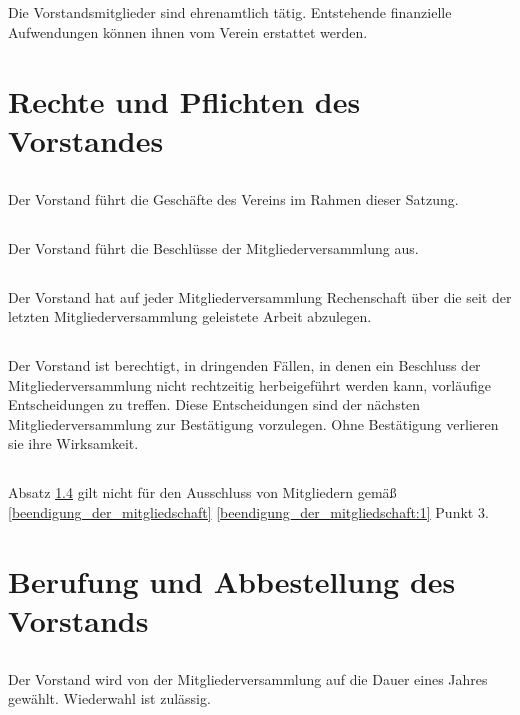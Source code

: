 \documentclass[12pt]{article}
\begin{document}
\subsection{}
Die Vorstandsmitglieder sind ehrenamtlich tätig. Entstehende finanzielle Aufwendungen können ihnen vom Verein erstattet werden.

\section{Rechte und Pflichten des Vorstandes}
\label{rechte_pflichten_vorstand}
\subsection{}
Der Vorstand führt die Geschäfte des Vereins im Rahmen dieser Satzung.
\subsection{}
Der Vorstand führt die Beschlüsse der Mitgliederversammlung aus.
\subsection{}
Der Vorstand hat auf jeder Mitgliederversammlung Rechenschaft über die seit der letzten Mitgliederversammlung geleistete Arbeit abzulegen.
\subsection{}
\label{rechte_pflichten_vorstand:4}
Der Vorstand ist berechtigt, in dringenden Fällen, in denen ein Beschluss der Mitgliederversammlung nicht rechtzeitig herbeigeführt werden kann, vorläufige Entscheidungen zu treffen. Diese Entscheidungen sind der nächsten Mitgliederversammlung zur Bestätigung vorzulegen. Ohne Bestätigung verlieren sie ihre Wirksamkeit.
\subsection{}
Absatz \ref{rechte_pflichten_vorstand:4} gilt nicht für den Ausschluss von Mitgliedern gemäß \ref{beendigung_der_mitgliedschaft} \ref{beendigung_der_mitgliedschaft:1} Punkt 3.

\section{Berufung und Abbestellung des Vorstands}
\subsection{}
Der Vorstand wird von der Mitgliederversammlung auf die Dauer eines Jahres gewählt. Wiederwahl ist zulässig.
\end{document}
